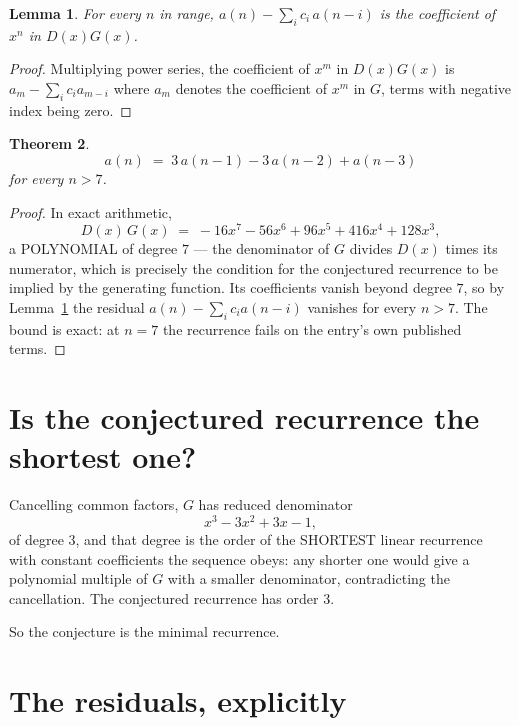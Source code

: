 \documentclass[11pt,a4paper]{article}
\theoremstyle{plain}
\newtheorem{theorem}{Theorem}
\newtheorem{lemma}[theorem]{Lemma}
\theoremstyle{definition}
\begin{document}
\begin{lemma}\label{lem:key}
For every $n$ in range, $a(n)-\sum_i c_i\,a(n-i)$ is the coefficient of $x^{n}$ in
$D(x)G(x)$.
\end{lemma}

\begin{proof}
Multiplying power series, the coefficient of $x^{m}$ in $D(x)G(x)$ is
$a_m-\sum_i c_i a_{m-i}$ where $a_m$ denotes the coefficient of $x^{m}$ in $G$, terms with
negative index being zero.
\end{proof}

\begin{theorem}
\[
a(n)\;=\;3\,a(n-1) - 3\,a(n-2) + a(n-3)
\]
for every $n>7$.
\end{theorem}

\begin{proof}
In exact arithmetic,
\[
D(x)\,G(x)\;=\;- 16 x^{7} - 56 x^{6} + 96 x^{5} + 416 x^{4} + 128 x^{3},
\]
a POLYNOMIAL of degree $7$ --- the denominator of $G$ divides $D(x)$ times its numerator,
which is precisely the condition for the conjectured recurrence to be implied by the
generating function. Its coefficients vanish beyond degree $7$, so by
Lemma~\ref{lem:key} the residual $a(n)-\sum_ic_ia(n-i)$ vanishes for every
$n>7$. The bound is exact: at $n=7$ the recurrence fails on the entry's own published terms.
\end{proof}

\section{Is the conjectured recurrence the shortest one?}

Cancelling common factors, $G$ has reduced denominator
\[
x^{3} - 3 x^{2} + 3 x - 1,
\]
of degree $3$, and that degree is the order of the SHORTEST linear recurrence with
constant coefficients the sequence obeys: any shorter one would give a polynomial multiple of
$G$ with a smaller denominator, contradicting the cancellation. The conjectured recurrence has
order $3$.

So the conjecture is the minimal recurrence.

\section{The residuals, explicitly}
\end{document}
